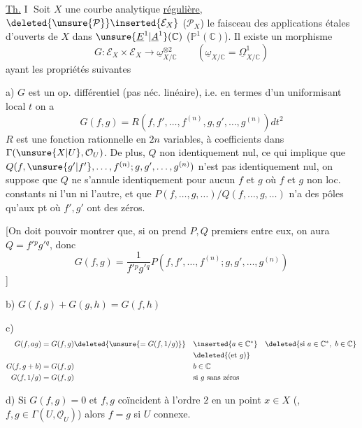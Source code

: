 \uline{Th.} \textcircled{I} Soit $X$ une courbe analytique \uline{régulière},
$\deleted{\unsure{\mathcal{P}}}\inserted{\mathcal{E}_X}$ ($\mathcal{P}_X$) le
faisceau des applications étales d'ouverts de $X$ dans
$\unsure{\underline{E}^{1}|\underline{A}^{1}}(\mathbb{C})$
($\mathbb{P}^{1}(\mathbb{C})$). Il existe un morphisme
\[
G:\mathcal{E}_X\times\mathcal{E}_X\longrightarrow
\underline{\omega}_{X/\mathbb{C}}^{\otimes2}
\qquad
(\underline{\omega}_{X/\mathbb{C}}=\underline{\Omega}^{1}_{X/\mathbb{C}})
\]
ayant les propriétés suivantes

a) $G$ est un op. différentiel (pas néc. linéaire), i.e. en
termes d'un uniformisant local $t$  on a
\[
G(f,g)=R(f,f',\ldots,f^{(n)},g,g',\ldots,g^{(n)})dt^2
\]
$R$ est une fonction rationnelle en $2n$ variables, à
coefficients dans $\Gamma(\unsure{X|U},\mathcal{O}_U)$.
De plus, 
$Q$ non identiquement nul,  ce qui implique
que $Q(f,\unsure{g'|f'},\ldots,f^{(n)};g,g',\ldots,g^{(n)})$ n'est pas identiquement
nul, on suppose que $Q$ ne s'annule identiquement pour
aucun $f$ et $g$ où $f$ et $g$ non loc. constants ni l'un
ni l'autre, et que $P(f,\ldots,g,\ldots)/Q(f,\ldots,g,\ldots)$ n'a
 des pôles qu'aux pt où $f',g'$ ont des zéros.

[On doit pouvoir montrer que, si on prend $P,Q$
premiers entre eux, on aura 
$Q=f'{}^p g'{}^q$, donc
\[
G(f,g)=\frac{1}{f'{}^p g'{}^q}
P(f,f',\ldots,f^{(n)};g,g',\ldots,g^{(n)})
\]
]

b) $G(f,g)+G(g,h)=G(f,h)$

c)
\[
\begin{aligned}
G(f,ag)&=G(f,g)\deleted{\unsure{=G(f,1/g)}}
&&\inserted{a\in\mathbb{C}^{*}}\quad
\deleted{\text{si }a\in\mathbb{C}^{*},\ b\in\mathbb{C}}\\
&&&\deleted{(\text{et }g)}\\
G(f,g+b)&=G(f,g)&&b\in\mathbb{C}\\
G(f,1/g)&=G(f,g)&&\text{si }g\text{ sans zéros}
\end{aligned}
\]

d)  Si $G(f,g)=0$ et $f,g$ coïncident à l'ordre $2$
en un point $x\in X$ (, $f,g\in\Gamma(U,\underline{\mathcal{O}}_U)$)
alors $f=g$ si $U$ connexe.

